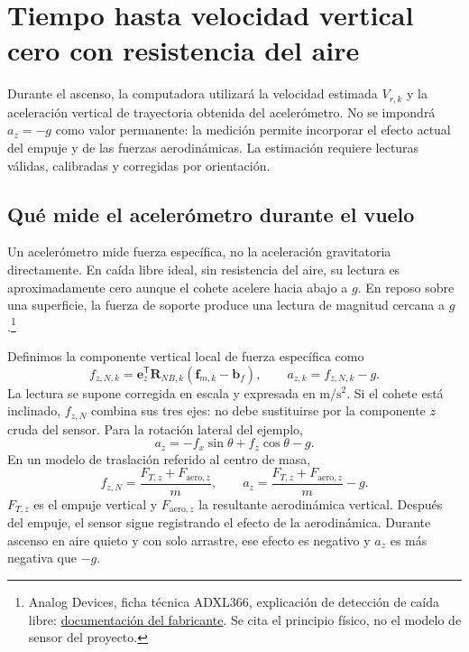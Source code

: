 \newpage
\section{Tiempo hasta velocidad vertical cero con resistencia del aire}
Durante el ascenso, la computadora utilizará la velocidad estimada $V_{r,k}$ y la aceleración vertical de trayectoria obtenida del acelerómetro. No se impondrá $a_z=-g$ como valor permanente: la medición permite incorporar el efecto actual del empuje y de las fuerzas aerodinámicas. La estimación requiere lecturas válidas, calibradas y corregidas por orientación.

\subsection{Qué mide el acelerómetro durante el vuelo}
Un acelerómetro mide fuerza específica, no la aceleración gravitatoria directamente. En caída libre ideal, sin resistencia del aire, su lectura es aproximadamente cero aunque el cohete acelere hacia abajo a $g$. En reposo sobre una superficie, la fuerza de soporte produce una lectura de magnitud cercana a $g$.\footnote{Analog Devices, ficha técnica ADXL366, explicación de detección de caída libre: \href{https://www.analog.com/media/en/technical-documentation/data-sheets/adxl366.pdf}{documentación del fabricante}. Se cita el principio físico, no el modelo de sensor del proyecto.}

Definimos la componente vertical local de fuerza específica como
\begin{equation}
 f_{z,N,k}=\mathbf e_z^{\mathsf T}\mathbf R_{NB,k}
 (\mathbf f_{m,k}-\mathbf b_f),
 \qquad \boxed{a_{z,k}=f_{z,N,k}-g}.
\end{equation}
La lectura se supone corregida en escala y expresada en $\mathrm{m/s^2}$. Si el cohete está inclinado, $f_{z,N}$ combina sus tres ejes: no debe sustituirse por la componente $z$ cruda del sensor. Para la rotación lateral del ejemplo,
\begin{equation}
 a_z=-f_x\sin\theta+f_z\cos\theta-g.
\end{equation}
En un modelo de traslación referido al centro de masa,
\begin{equation}
 f_{z,N}=\frac{F_{T,z}+F_{\mathrm{aero},z}}{m},\qquad
 a_z=\frac{F_{T,z}+F_{\mathrm{aero},z}}{m}-g.
\end{equation}
$F_{T,z}$ es el empuje vertical y $F_{\mathrm{aero},z}$ la resultante aerodinámica vertical. Después del empuje, el sensor sigue registrando el efecto de la aerodinámica. Durante ascenso en aire quieto y con solo arrastre, ese efecto es negativo y $a_z$ es más negativa que $-g$.

